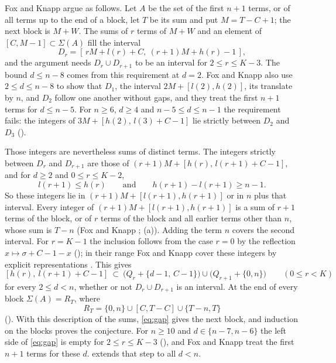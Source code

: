 \documentclass[11pt]{article}
\theoremstyle{remark}
\begin{document}
Fox and Knapp \cite[Section~3]{FK} argue as follows. Let $A$ be the set of the first $n+1$ terms, or of all terms up
to the end of a block, let $T$ be its sum and put $M=T-C+1$; the next block is $M+W$. The sums of $r$ terms of $M+W$
and an element of $[C,M-1]\subset\Sigma(A)$ fill the interval
\[
D_r=[\,rM+l(r)+C,\ (r+1)M+h(r)-1\,],
\]
and the argument needs $D_r\cup D_{r+1}$ to be an interval for $2\le r\le K-3$. The bound $d\le n-8$ comes from
this requirement at $d=2$. Fox and Knapp also use $2\le d\le n-8$ to show that $D_1$, the interval $2M+[l(2),h(2)]$,
its translate by $n$, and $D_2$ follow one another without gaps, and they treat the first $n+1$ terms for $d\le n-5$. For $n\ge 6$, $d\ge 4$ and $n-5\le d\le n-1$ the requirement fails: the integers
of $3M+[h(2),\,l(3)+C-1]$ lie strictly between $D_2$ and $D_3$ ().

Those integers are nevertheless sums of distinct terms. The integers strictly between $D_r$ and $D_{r+1}$ are those
of $(r+1)M+[h(r),\,l(r+1)+C-1]$, and for $d\ge 2$ and $0\le r\le K-2$,
\[
l(r+1)\le h(r)\qquad\text{and}\qquad h(r+1)-l(r+1)\ge n-1 .
\]
So these integers lie in $(r+1)M+[l(r+1),h(r+1)]$ or in $n$ plus that interval. Every integer of
$(r+1)M+[l(r+1),h(r+1)]$ is a sum of $r+1$ terms of the block, or of $r$ terms of the block and all earlier terms
other than $n$, whose sum is $T-n$ (Fox and Knapp \cite[Section~3]{FK}; (a)). Adding the term $n$
covers the second interval. For $r=K-1$ the inclusion follows from the case $r=0$ by the reflection
$x\mapsto\sigma+C-1-x$ (); in their range Fox and Knapp cover these integers by explicit
representations \cite[Section~3, pp.~11--12]{FK}. This gives
\begin{equation}\label{eq:gap}
[h(r),\ l(r+1)+C-1]\ \subset\ \bigl(Q_r+\{d-1,\,C-1\}\bigr)\cup\bigl(Q_{r+1}+\{0,n\}\bigr)\qquad(0\le r<K)
\end{equation}
for every $2\le d<n$, whether or not $D_r\cup D_{r+1}$ is an interval. At the end of every block
$\Sigma(A)=R_T$, where
\begin{equation}\label{eq:RT}
R_T=\{0,n\}\cup[C,T-C]\cup\{T-n,T\}
\end{equation}
(). With this description of the sums, \eqref{eq:gap} gives the next block, and induction on
the blocks proves the conjecture. For $n\ge10$ and $d\in\{n-7,n-6\}$ the left side of \eqref{eq:gap} is empty for $2\le r\le K-3$
(), and Fox and Knapp treat the first $n+1$ terms for these $d$.  extends that step
to all $d<n$.
\end{document}
